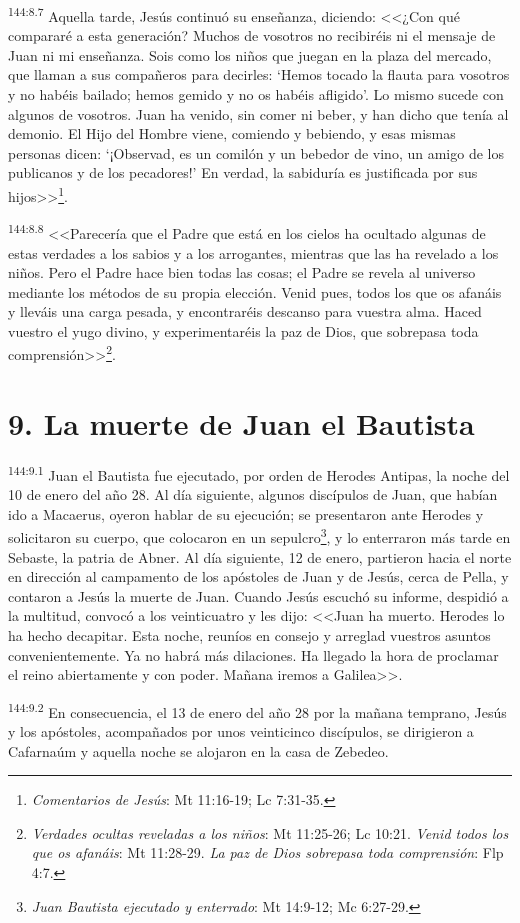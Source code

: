 \par 
\textsuperscript{144:8.7} Aquella tarde, Jesús continuó su enseñanza, diciendo: <<¿Con qué compararé a esta generación? Muchos de vosotros no recibiréis ni el mensaje de Juan ni mi enseñanza. Sois como los niños que juegan en la plaza del mercado, que llaman a sus compañeros para decirles: `Hemos tocado la flauta para vosotros y no habéis bailado; hemos gemido y no os habéis afligido'. Lo mismo sucede con algunos de vosotros. Juan ha venido, sin comer ni beber, y han dicho que tenía al demonio. El Hijo del Hombre viene, comiendo y bebiendo, y esas mismas personas dicen: `¡Observad, es un comilón y un bebedor de vino, un amigo de los publicanos y de los pecadores!' En verdad, la sabiduría es justificada por sus hijos>>\footnote{\textit{Comentarios de Jesús}: Mt 11:16-19; Lc 7:31-35.}.

\par 
\textsuperscript{144:8.8} <<Parecería que el Padre que está en los cielos ha ocultado algunas de estas verdades a los sabios y a los arrogantes, mientras que las ha revelado a los niños. Pero el Padre hace bien todas las cosas; el Padre se revela al universo mediante los métodos de su propia elección. Venid pues, todos los que os afanáis y lleváis una carga pesada, y encontraréis descanso para vuestra alma. Haced vuestro el yugo divino, y experimentaréis la paz de Dios, que sobrepasa toda comprensión>>\footnote{\textit{Verdades ocultas reveladas a los niños}: Mt 11:25-26; Lc 10:21. \textit{Venid todos los que os afanáis}: Mt 11:28-29. \textit{La paz de Dios sobrepasa toda comprensión}: Flp 4:7.}.

\section*{9. La muerte de Juan el Bautista}
\par 
\textsuperscript{144:9.1} Juan el Bautista fue ejecutado, por orden de Herodes Antipas, la noche del 10 de enero del año 28. Al día siguiente, algunos discípulos de Juan, que habían ido a Macaerus, oyeron hablar de su ejecución; se presentaron ante Herodes y solicitaron su cuerpo, que colocaron en un sepulcro\footnote{\textit{Juan Bautista ejecutado y enterrado}: Mt 14:9-12; Mc 6:27-29.}, y lo enterraron más tarde en Sebaste, la patria de Abner. Al día siguiente, 12 de enero, partieron hacia el norte en dirección al campamento de los apóstoles de Juan y de Jesús, cerca de Pella, y contaron a Jesús la muerte de Juan. Cuando Jesús escuchó su informe, despidió a la multitud, convocó a los veinticuatro y les dijo: <<Juan ha muerto. Herodes lo ha hecho decapitar. Esta noche, reuníos en consejo y arreglad vuestros asuntos convenientemente. Ya no habrá más dilaciones. Ha llegado la hora de proclamar el reino abiertamente y con poder. Mañana iremos a Galilea>>.

\par 
\textsuperscript{144:9.2} En consecuencia, el 13 de enero del año 28 por la mañana temprano, Jesús y los apóstoles, acompañados por unos veinticinco discípulos, se dirigieron a Cafarnaúm y aquella noche se alojaron en la casa de Zebedeo.